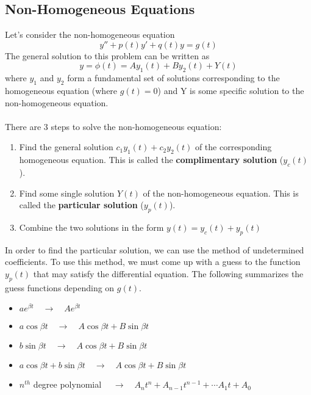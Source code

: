 \documentclass[11pt]{article}
\begin{document}
\subsection{Non-Homogeneous Equations}
Let's consider the non-homogeneous equation 
$$y'' +p(t)y'+q(t)y=g(t)$$
The general solution to this problem can be written as $$y = \phi(t) = Ay_1(t)+By_2(t)+Y(t)$$
where $y_1$ and $y_2$ form a fundamental set of solutions corresponding to the homogeneous equation (where $g(t) = 0$) and Y is some specific solution to the non-homogeneous equation.  \\ \\ There are 3 steps to solve the non-homogeneous equation:
\begin{enumerate}
\item Find the general solution $c_1y_1(t) +c_2y_2(t)$ of the corresponding homogeneous equation. This is called the \textbf{complimentary solution} ($y_c(t)$).
\item Find some single solution $Y(t)$ of the non-homogeneous equation. This is called the \textbf{particular solution} ($y_p(t)$).
\item Combine the two solutions in the form $y(t) = y_c(t) + y_p(t)$
\end{enumerate}
In order to find the particular solution, we can use the method of undetermined coefficients. To use this method, we must come up with a guess to the function $y_p(t)$ that may satisfy the differential equation. The following summarizes the guess functions depending on $g(t)$.
\begin{itemize}
\item $a e^{\beta t} \quad \rightarrow \quad Ae^{\beta t}$ 
\item $a \cos {\beta t} \quad \rightarrow \quad A \cos {\beta t} + B \sin {\beta t}$ 
\item $b \sin {\beta t} \quad \rightarrow \quad A \cos {\beta t} + B \sin {\beta t}$ 
\item $a \cos {\beta t} + b \sin {\beta t} \quad \rightarrow \quad A \cos {\beta t} + B \sin {\beta t}$ 
\item $n^{th}$ degree polynomial $\quad \rightarrow \quad A_nt^n + A_{n-1}t^{n-1} + \cdots A_1t + A_0$

\end{itemize}
 
\end{document}

